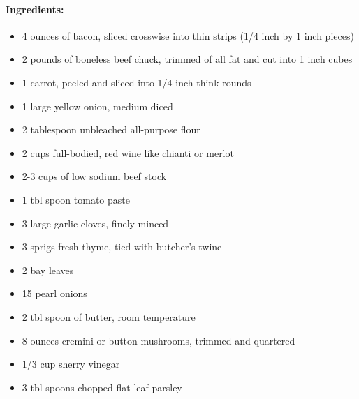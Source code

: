 \documentclass{article}
\begin{document}
\paragraph{Ingredients:}

\begin{itemize}
	\item 4 ounces of bacon, sliced crosswise into thin strips (1/4 inch by 1 inch pieces)
	\item 2 pounds of boneless beef chuck, trimmed of all fat and cut into 1 inch cubes
	\item 1 carrot, peeled and sliced into 1/4 inch think rounds
	\item 1 large yellow onion, medium diced
	\item 2 tablespoon unbleached all-purpose flour
	\item 2 cups full-bodied, red wine like chianti or merlot
	\item 2-3 cups of low sodium beef stock
	\item 1 tbl spoon tomato paste
	\item 3 large garlic cloves, finely minced
	\item 3 sprigs fresh thyme, tied with butcher's twine
	\item 2 bay leaves
	\item 15 pearl onions
	\item 2 tbl spoon of butter, room temperature
	\item 8 ounces cremini or button mushrooms, trimmed and quartered
	\item 1/3 cup sherry vinegar
	\item 3 tbl spoons chopped flat-leaf parsley
\end{itemize}
\end{document}
